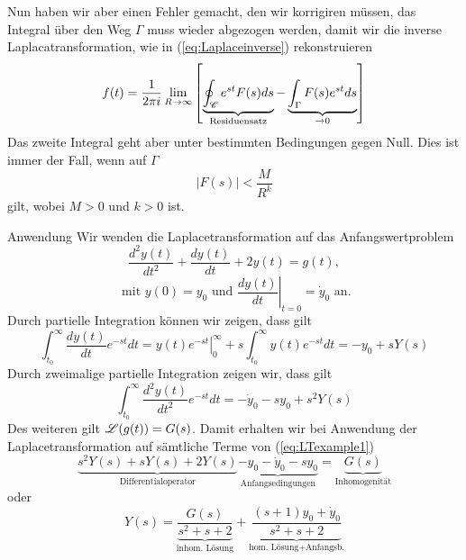 Nun haben wir aber einen Fehler gemacht, den wir korrigiren müssen, das Integral
über den Weg $\Gamma$ muss wieder abgezogen werden, damit wir die inverse
Laplacatransformation, wie in (\ref{eq:Laplaceinverse}) rekonstruieren
\begin{equation}\label{eq:Laplaceinverse2}
f(t)=\frac{1}{2\pi i}\lim_{R\rightarrow\infty}\left[
\underbrace{\oint_{\cal C}e^{st}F(s)ds}_{\text{Residuensatz}}
-\underbrace{\int_{\Gamma} F(s) e^{st}ds}_{\rightarrow 0}\right]
\end{equation}
Das zweite Integral geht aber unter bestimmten Bedingungen gegen Null. 
Dies ist immer der Fall, wenn auf $\Gamma$
\[|F(s)|<\frac{M}{R^k}\]
gilt, wobei $M>0$ und $k>0$ ist.

\begin{example}{Anwendung}
Wir wenden die Laplacetransformation auf das Anfangswertproblem
  \begin{equation}
    \frac{d^2y(t)}{dt^2}+ \frac{dy(t)}{dt}+2y(t)=g(t), 
    \label{eq:LTexample1}
  \end{equation}
  \[\mbox{ mit } y(0)=y_0\mbox{ und } \left.\frac{dy(t)}{dt}\right|_{t=0}=\dot{y}_0\mbox{ an.}\]
Durch partielle Integration können wir zeigen, dass gilt
\[\int_{t_0}^\infty\frac{dy(t)}{dt}e^{-st}dt=
\left.y(t)e^{-st}\right|_0^\infty+s\int_{t_0}^\infty y(t)e^{-st}dt=-y_0+sY(s)\]
Durch zweimalige partielle Integration zeigen wir, dass gilt
\[\int_{t_0}^\infty\frac{d^2y(t)}{dt^2}e^{-st}dt=-\dot{y}_0-sy_0+s^2Y(s)\]
Des weiteren gilt ${\cal L}(g(t))=G(s)$. Damit erhalten wir bei Anwendung der
Laplacetransformation auf sämtliche Terme von (\ref{eq:LTexample1})
\[
\underbrace{s^2Y(s)+sY(s)+2Y(s)}_{\text{Differentialoperator}}
\underbrace{-y_0-\dot{y}_0-sy_0}_{\text{Anfangsedingungen}}=
\underbrace{G(s)}_{\text{Inhomogenität}}
\]  
oder
\begin{equation}
  Y(s)=\underbrace{\frac{G(s)}{s^2+s+2}}_{\mbox{inhom. Lösung}}
  +\underbrace{\frac{(s+1)y_0+\dot{y}_0}{s^2+s+2}}_{\mbox{hom. Lösung+Anfangsb.}}
\end{equation}
\end{example}
\newpage